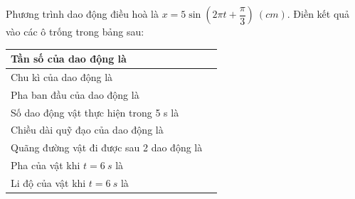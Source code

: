 \begin{vidu}
Phương trình dao động điều hoà là $x=5\sin\!\left(2\pi t+\dfrac{\pi}{3}\right)\ (cm)$.  
Điền kết quả vào các ô trống trong bảng sau:	
\begin{center}
\renewcommand{\arraystretch}{1.3}
\begin{tabular}{|p{10cm}|p{3cm}|}
\hline Tần số của dao động là & \\ \hline
\hline Chu kì của dao động là & \\ \hline
\hline Pha ban đầu của dao động là & \\ \hline
\hline
Số dao động vật thực hiện trong 5 s là & \\ \hline
 \hline Chiều dài quỹ đạo của dao động là & \\ \hline
 \hline Quãng đường vật đi được sau 2 dao động là & \\ \hline
 \hline
 Pha của vật khi $t=6\ s$ là& \\ \hline
 \hline
 Li độ của vật khi $t=6\ s$ là& \\ \hline
\end{tabular}
\end{center}

\end{vidu}
